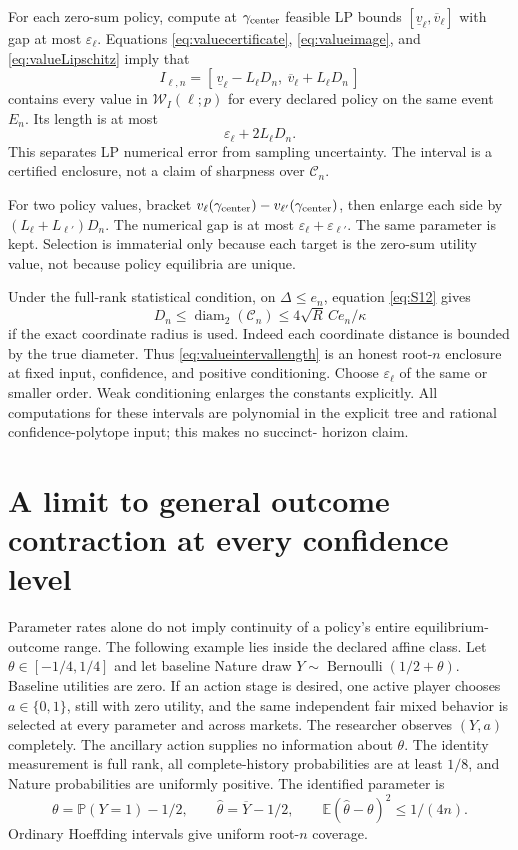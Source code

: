 \documentclass[11pt,a4paper]{article}
\numberwithin{equation}{section}
\theoremstyle{definition}
\newcommand{\E}{\mathbb E}
\newcommand{\Prob}{\mathbb P}
\DeclareMathOperator{\diam}{diam}
\begin{document}
For each zero-sum policy, compute at \(\gamma_{\rm center}\)
feasible LP bounds
\([\underline v_\ell,\overline v_\ell]\) with gap at most
\(\varepsilon_\ell\). Equations \eqref{eq:valuecertificate},
\eqref{eq:valueimage}, and \eqref{eq:valueLipschitz} imply that
\begin{equation}\label{eq:valueinterval}
 I_{\ell,n}=
  [\,\underline v_\ell-L_\ell D_n,\
                 \overline v_\ell+L_\ell D_n\,]
\end{equation}
contains every value in \(\mathcal W_I(\ell;p)\) for every declared
policy on the same event \(E_n\). Its length is at most
\begin{equation}\label{eq:valueintervallength}
 \varepsilon_\ell+2L_\ell D_n .
\end{equation}
This separates LP numerical error from sampling uncertainty.
The interval is a certified enclosure, not a claim of sharpness
over \(\mathcal C_n\).

For two policy values, bracket
\(v_\ell(\gamma_{\rm center})-v_{\ell'}(\gamma_{\rm center})\),
then enlarge each side by \((L_\ell+L_{\ell'})D_n\).
The numerical gap is at most
\(\varepsilon_\ell+\varepsilon_{\ell'}\).
The same parameter is kept. Selection is immaterial only because
each target is the zero-sum utility value, not because policy
equilibria are unique.

Under the full-rank statistical condition, on
\(\Delta\le e_n\), equation \eqref{eq:S12} gives
\[
 D_n\le\diam_2(\mathcal C_n)
          \le4\sqrt R\,Ce_n/\kappa
\]
if the exact coordinate radius is used.
Indeed each coordinate distance is bounded by the true diameter.
Thus \eqref{eq:valueintervallength} is an honest root-\(n\)
enclosure at fixed input, confidence, and positive conditioning.
Choose \(\varepsilon_\ell\) of the same or smaller order.
Weak conditioning enlarges the constants explicitly.
All computations for these intervals are polynomial in the explicit
tree and rational confidence-polytope input; this makes no succinct-
horizon claim.

\section{A limit to general outcome contraction at every confidence level}
\label{sec:impossibility}
Parameter rates alone do not imply continuity of a policy's entire
equilibrium-outcome range. The following example lies inside the
declared affine class.
Let \(\theta\in[-1/4,1/4]\) and let baseline Nature draw
\(Y\sim\operatorname{Bernoulli}(1/2+\theta)\).
Baseline utilities are zero. If an action stage is desired, one active
player chooses \(a\in\{0,1\}\), still with zero utility, and the same
independent fair mixed behavior is selected at every parameter
and across markets. The researcher observes \((Y,a)\) completely.
The ancillary action supplies no information about \(\theta\).
The identity measurement is full rank, all complete-history probabilities
are at least \(1/8\), and Nature probabilities are uniformly positive.
The identified parameter is
\[
 \theta=\Prob(Y=1)-1/2,\qquad
 \widehat\theta=\overline Y-1/2,\qquad
 \E(\widehat\theta-\theta)^2\le1/(4n).
\]
Ordinary Hoeffding intervals give uniform root-\(n\) coverage.
\end{document}
